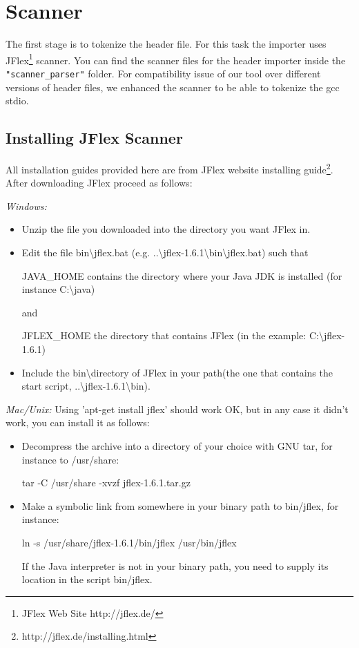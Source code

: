 \documentclass[titlepage]{article}
\begin{document}
\section{Scanner}
The first stage is to tokenize the header file. For this task the importer uses JFlex\footnote{JFlex Web Site http://jflex.de/} scanner. You can find the scanner files for the header importer inside the \texttt{"scanner\_parser"} folder. For compatibility issue of our tool over different versions of header files, we enhanced the scanner to be able to tokenize the gcc stdio.

\subsection{Installing JFlex Scanner}
All installation guides provided here are from  JFlex website installing guide\footnote{http://jflex.de/installing.html}. After downloading JFlex proceed as follows:

\emph{Windows:}
\begin{itemize}
\item Unzip the file you downloaded into the directory you want JFlex in.
\item Edit the file bin\textbackslash jflex.bat (e.g. ..\textbackslash jflex-1.6.1\textbackslash bin\textbackslash jflex.bat) such that

JAVA\_HOME contains the directory where your Java JDK is installed (for instance C:\textbackslash java)

and

JFLEX\_HOME the directory that contains JFlex (in the example: C:\textbackslash jflex-1.6.1)

\item Include the bin\textbackslash directory of JFlex in your path(the one that contains the start script, ..\textbackslash jflex-1.6.1\textbackslash bin). 
\end{itemize}

\emph{Mac/Unix:}
Using 'apt-get install jflex' should work OK, but in any case it didn't work, you can install it as follows:

\begin{itemize}
\item Decompress the archive into a directory of your choice with GNU tar, for instance to /usr/share:

tar -C /usr/share -xvzf jflex-1.6.1.tar.gz

\item Make a symbolic link from somewhere in your binary path to bin/jflex, for instance:

ln -s /usr/share/jflex-1.6.1/bin/jflex /usr/bin/jflex

If the Java interpreter is not in your binary path, you need to supply its location in the script bin/jflex.
\end{itemize}
\end{document}
